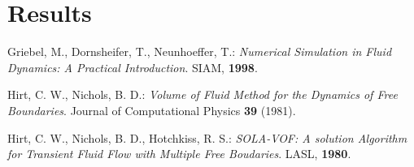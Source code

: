 \documentclass[a4paper, 12pt]{article}
\begin{document}
\section{Results}\label{sec:results}

\begin{thebibliography}{99}
Griebel, M., Dornsheifer, T., Neunhoeffer, T.: \emph{Numerical Simulation in
Fluid Dynamics: A Practical Introduction}. SIAM, {\bf 1998}.

Hirt, C. W., Nichols, B. D.: \emph{Volume of Fluid Method for the Dynamics of Free Boundaries}. Journal of Computational Physics {\bf 39} (1981).

Hirt, C. W., Nichols, B. D., Hotchkiss, R. S.: \emph{SOLA-VOF: A solution Algorithm for Transient Fluid Flow with Multiple Free Boudaries}. LASL, {\bf 1980}.
\end{thebibliography}
\end{document}
